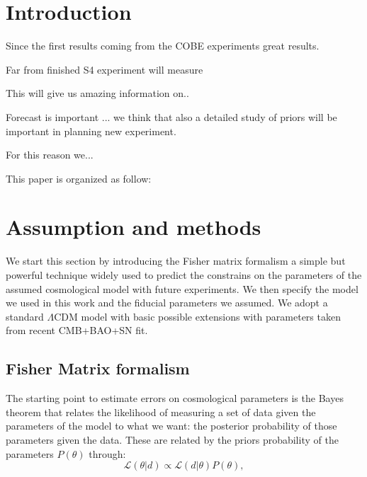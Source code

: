 \documentclass[aps,prd,preprint,groupedaddress]{revtex4-1}
\begin{document}
\pacs{}

\maketitle

\section{Introduction \label{sec:intro}}

Since the first results coming from the COBE experiments great results.

Far from finished S4 experiment will measure

This will give us amazing information on..

Forecast is important \cite{wu:2014} ... we think that also a detailed study of priors will be important in planning new experiment.

For this reason we...

This paper is organized as follow:



\section{Assumption and methods \label{sec:intro} }
We start this section by introducing the Fisher matrix formalism a simple but powerful technique widely used to predict the constrains on the parameters of the assumed cosmological model with future experiments. We then specify the model we used in this work and the fiducial parameters we assumed. 
We adopt a standard $\Lambda$CDM model with basic possible extensions with parameters taken from recent CMB+BAO+SN fit.

\subsection{Fisher Matrix formalism}
The starting point to estimate errors on cosmological parameters  is the Bayes theorem that relates the likelihood of measuring a set of data given the parameters of the model to what we want: the posterior probability of those parameters given the data.
These are related by the priors probability of the parameters $P(\theta)$ through:
\begin{equation}
\mathcal{L}(\theta|d)\propto \mathcal{L}(d|\theta)P(\theta),
\end{equation}
\end{document}
